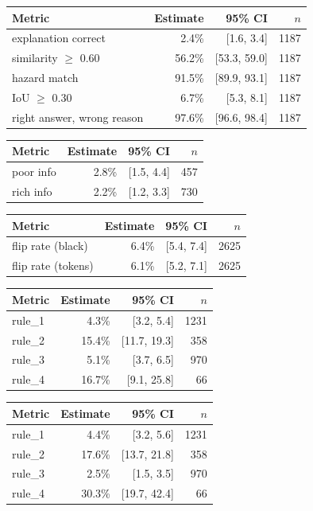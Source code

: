 \begin{tabular}{lrrr}
\toprule
Metric & Estimate & 95\% CI & $n$ \\
\midrule
explanation correct & 2.4\% & [1.6, 3.4] & 1187 \\
similarity $\geq$ 0.60 & 56.2\% & [53.3, 59.0] & 1187 \\
hazard match & 91.5\% & [89.9, 93.1] & 1187 \\
IoU $\geq$ 0.30 & 6.7\% & [5.3, 8.1] & 1187 \\
right answer, wrong reason & 97.6\% & [96.6, 98.4] & 1187 \\
\bottomrule
\end{tabular}

\begin{tabular}{lrrr}
\toprule
Metric & Estimate & 95\% CI & $n$ \\
\midrule
poor info & 2.8\% & [1.5, 4.4] & 457 \\
rich info & 2.2\% & [1.2, 3.3] & 730 \\
\bottomrule
\end{tabular}

\begin{tabular}{lrrr}
\toprule
Metric & Estimate & 95\% CI & $n$ \\
\midrule
flip rate (black) & 6.4\% & [5.4, 7.4] & 2625 \\
flip rate (tokens) & 6.1\% & [5.2, 7.1] & 2625 \\
\bottomrule
\end{tabular}

\begin{tabular}{lrrr}
\toprule
Metric & Estimate & 95\% CI & $n$ \\
\midrule
rule\_1 & 4.3\% & [3.2, 5.4] & 1231 \\
rule\_2 & 15.4\% & [11.7, 19.3] & 358 \\
rule\_3 & 5.1\% & [3.7, 6.5] & 970 \\
rule\_4 & 16.7\% & [9.1, 25.8] & 66 \\
\bottomrule
\end{tabular}

\begin{tabular}{lrrr}
\toprule
Metric & Estimate & 95\% CI & $n$ \\
\midrule
rule\_1 & 4.4\% & [3.2, 5.6] & 1231 \\
rule\_2 & 17.6\% & [13.7, 21.8] & 358 \\
rule\_3 & 2.5\% & [1.5, 3.5] & 970 \\
rule\_4 & 30.3\% & [19.7, 42.4] & 66 \\
\bottomrule
\end{tabular}

